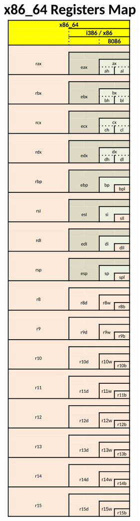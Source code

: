 \documentclass[letterpaper,12pt]{exam}
\begin{document}
\begin{center}
\includegraphics{../../02_Registers/images/X86_64-GP-registers.png}

\end{center}
\end{document}
